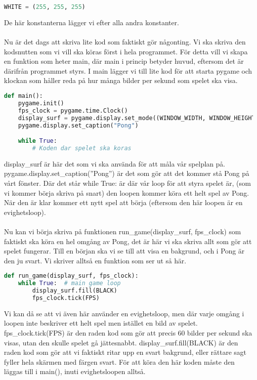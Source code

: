 \documentclass{article}
\begin{document}
\begin{lstlisting}[language=Python]
WHITE = (255, 255, 255)
\end{lstlisting}
De här konstanterna lägger vi efter alla andra konstanter.\\
\\
Nu är det dags att skriva lite kod som faktiskt gör någonting. Vi ska skriva den kodsnutten som vi vill ska köras först i hela programmet. För detta vill vi skapa en funktion som heter main, där main i princip betyder huvud, eftersom det är därifrån programmet styrs. I main lägger vi till lite kod för att starta pygame och klockan som håller reda på hur många bilder per sekund som spelet ska visa.
\begin{lstlisting}[language=Python]
def main():
    pygame.init()
    fps_clock = pygame.time.Clock()
    display_surf = pygame.display.set_mode((WINDOW_WIDTH, WINDOW_HEIGHT))
    pygame.display.set_caption("Pong")

    while True:
        # Koden dar spelet ska koras
\end{lstlisting}
display\_surf är här det som vi ska använda för att måla vår spelplan på. pygame.display.set\_caption(''Pong'') är det som gör att det kommer stå Pong på vårt fönster. Där det står while True: är där vår loop för att styra spelet är, (som vi kommer börja skriva på snart) den loopen kommer köra ett helt spel av Pong. När den är klar kommer ett nytt spel att börja (eftersom den här loopen är en evighetsloop).\\
\\
Nu kan vi börja skriva på funktionen run\_game(display\_surf, fps\_clock) som faktiskt ska köra en hel omgång av Pong, det är här vi ska skriva allt som gör att spelet fungerar. Till en början ska vi se till att visa en bakgrund, och i Pong är den ju svart. Vi skriver alltså en funktion som ser ut så här.
\begin{lstlisting}[language=Python]
def run_game(display_surf, fps_clock):
    while True:  # main game loop
        display_surf.fill(BLACK)
        fps_clock.tick(FPS)
\end{lstlisting}
Vi kan då se att vi även här använder en evighetsloop, men där varje omgång i loopen inte beskriver ett helt spel men istället en bild av spelet. fps\_clock.tick(FPS) är den raden kod som gör att precis 60 bilder per sekund ska visas, utan den skulle spelet gå jättesnabbt. display\_surf.fill(BLACK) är den raden kod som gör att vi faktiskt ritar upp en svart bakgrund, eller rättare sagt fyller hela skärmen med färgen svart. För att köra den här koden måste den läggas till i main(), inuti evighetsloopen alltså.
\end{document}
